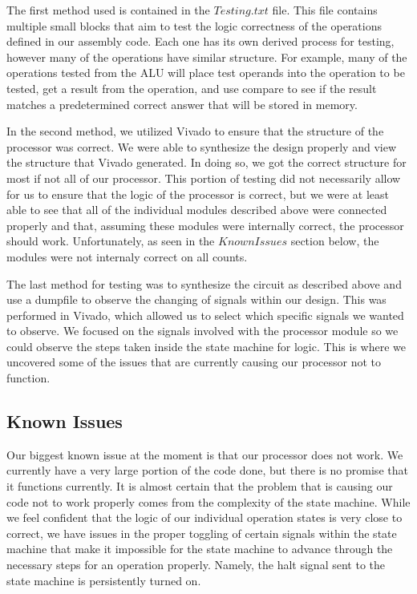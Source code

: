 \documentclass[journal]{IEEEtran}
\begin{document}
	The first method used is contained in the $Testing.txt$ file. This file contains multiple small blocks that aim to test the logic correctness of the operations defined in our assembly code. Each one has its own derived process for testing, however many of the operations have similar structure. For example, many of the operations tested from the ALU will place test operands into the operation to be tested, get a result from the operation, and use compare to see if the result matches a predetermined correct answer that will be stored in memory.
	
	In the second method, we utilized Vivado to ensure that the structure of the processor was correct. We were able to synthesize the design properly and view the structure that Vivado generated. In doing so, we got the correct structure for most if not all of our processor. This portion of testing did not necessarily allow for us to ensure that the logic of the processor is correct, but we were at least able to see that all of the individual modules described above were connected properly and that, assuming these modules were internally correct, the processor should work. Unfortunately, as seen in the $Known Issues$ section below, the modules were not internaly correct on all counts.
	
	The last method for testing was to synthesize the circuit as described above and use a dumpfile to observe the changing of signals within our design. This was performed in Vivado, which allowed us to select which specific signals we wanted to observe. We focused on the signals involved with the processor module so we could observe the steps taken inside the state machine for logic. This is where we uncovered some of the issues that are currently causing our processor not to function. 

\subsection{Known Issues}
	Our biggest known issue at the moment is that our processor does not work. We currently have a very large portion of the code done, but there is no promise that it functions currently. It is almost certain that the problem that is causing our code not to work properly comes from the complexity of the state machine. While we feel confident that the logic of our individual operation states is very close to correct, we have issues in the proper toggling of certain signals within the state machine that make it impossible for the state machine to advance through the necessary steps for an operation properly. Namely, the halt signal sent to the state machine is persistently turned on. 
\end{document}
